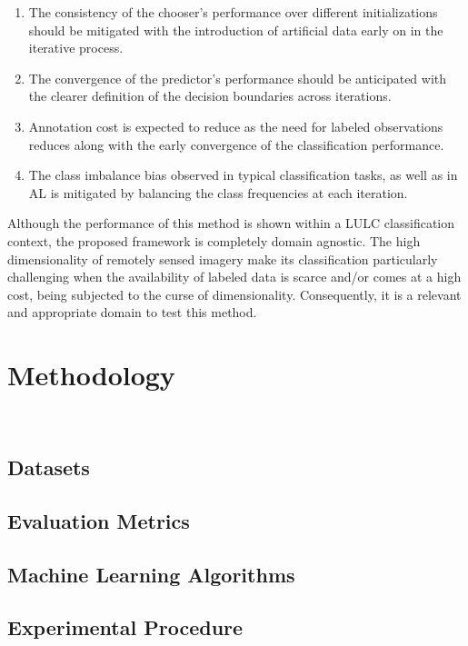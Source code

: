 \documentclass[parskip=full]{scrartcl}
\begin{document}
\begin{enumerate}
    \item The consistency of the chooser's performance over different initializations should be
        mitigated with the introduction of artificial data early on in the iterative process.
    \item The convergence of the predictor's performance should be anticipated with the clearer
        definition of the decision boundaries across iterations.
    \item Annotation cost is expected to reduce as the need for labeled observations reduces along
        with the early convergence of the classification performance.
    \item The class imbalance bias observed in typical classification tasks, as well as in AL is
        mitigated by balancing the class frequencies at each iteration.
\end{enumerate}

Although the performance of this method is shown within a LULC classification context, the proposed
framework is completely domain agnostic. The high dimensionality of remotely sensed imagery make its
classification particularly challenging when the availability of labeled data is scarce and/or comes
at a high cost, being subjected to the curse of dimensionality. Consequently, it is a relevant and
appropriate domain to test this method.

\section{Methodology}~\label{sec:methodology}

\subsection{Datasets}

\subsection{Evaluation Metrics}

\subsection{Machine Learning Algorithms}

\subsection{Experimental Procedure}
\end{document}
